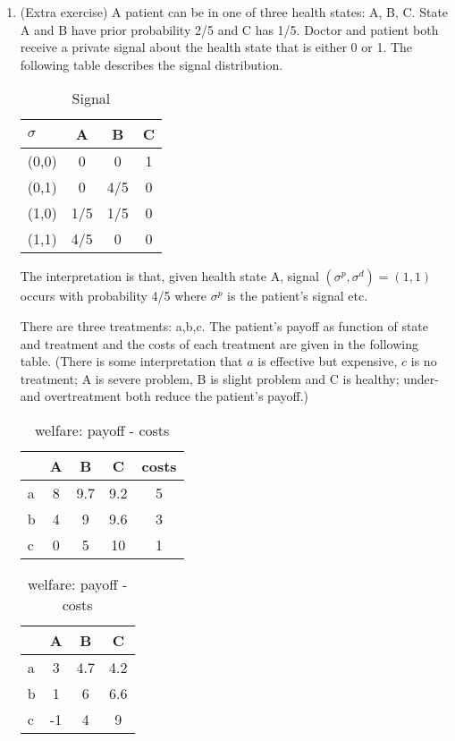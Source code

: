 \documentclass[a4paper,12pt]{article}
\begin{document}
\begin{enumerate}
    \item (Extra exercise) A patient can be in one of three health states: A, B, C. State A and B have prior probability 2/5 and C has 1/5. Doctor and patient both receive a private signal about the health state that is either 0 or 1. The following table describes the signal distribution.
      \begin{table}[h]
        \centering
        \begin{tabular}{l|c|c|c}
          $\sigma$&A&B&C\\ \hline
          (0,0) & 0 &0&1\\
          (0,1) & 0&4/5&0\\
          (1,0)&1/5&1/5&0\\
          (1,1)&4/5&0&0
        \end{tabular}
        \caption{Signal}
        \label{tab:signcifd}
      \end{table}

The interpretation is that, given health state A, signal $(\sigma^p,\sigma^d)=(1,1)$ occurs with probability 4/5 where $\sigma^p$ is the patient's signal etc.

There are three treatments: a,b,c. The patient's payoff as function of state and treatment and the costs of each treatment are given in the following table. (There is some interpretation that $a$ is effective but expensive, $c$ is no treatment; A is severe problem, B is slight problem and C is healthy; under- and overtreatment both reduce the patient's payoff.) 
\begin{table}[h]
  \centering
  \begin{tabular}{l|c|c|c|c}
    &A&B&C&costs\\ \hline
    a&8&9.7&9.2&5\\
    b&4&9&9.6&3\\
    c&0&5&10&1
  \end{tabular}
  \caption{Payoffs and costs}
  \label{tab:payoffcifd}
   \begin{tabular}{l|c|c|c}
    &A&B&C\\ \hline
    a&3&4.7&4.2\\
    b&1&6&6.6\\
    c&-1&4&9
  \end{tabular}
  \caption{welfare: payoff - costs}
  \label{tab:welfarecifd}
\end{table}


\end{enumerate}
\end{document}
